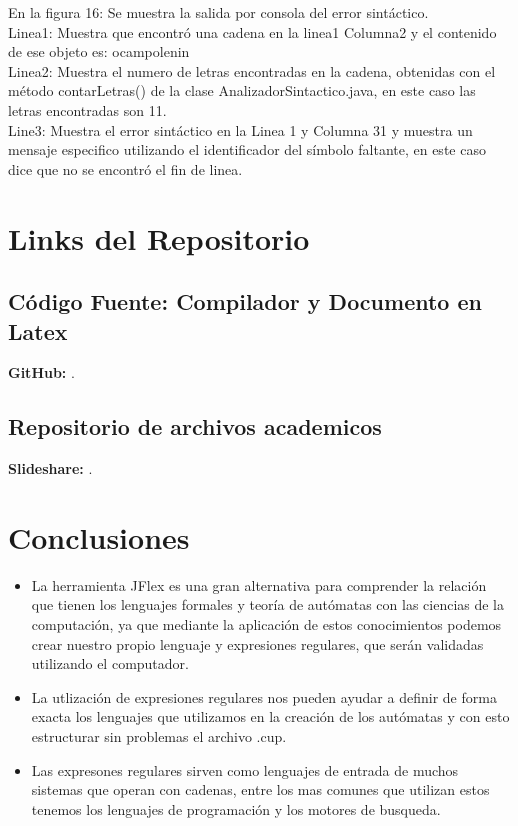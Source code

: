 \documentclass[a4paper,openright,12pt]{article}
\begin{document}
En la figura 16: Se muestra la salida por consola del error sintáctico.\\

Linea1: Muestra que encontró una cadena en la linea1 Columna2 y el contenido de ese objeto es: ocampolenin\\

Linea2:  Muestra el numero de letras encontradas en la cadena, obtenidas con el método contarLetras() de la clase AnalizadorSintactico.java, en este caso las letras encontradas son 11.\\

Line3: Muestra el error sintáctico en la Linea 1 y Columna 31 y muestra un mensaje especifico utilizando el identificador del símbolo faltante, en este caso dice que no se encontró el fin de linea.


\newpage
\section{Links del Repositorio}

\subsection{Código Fuente: Compilador y Documento en Latex}

\textbf{GitHub: } \url{}.

\subsection{Repositorio de archivos academicos }

\textbf{Slideshare: } \url{}.

\newpage
\section{Conclusiones}

\begin{itemize}

\item La herramienta JFlex es una gran alternativa para comprender la relación que tienen los lenguajes formales y teoría de autómatas con las ciencias de la computación, ya que mediante la aplicación de estos conocimientos podemos crear nuestro propio lenguaje y expresiones regulares, que serán validadas utilizando el computador.
\item La utlización de expresiones regulares nos pueden ayudar a definir de forma exacta los lenguajes que utilizamos en la creación de los autómatas y con esto estructurar sin problemas el archivo .cup.

\item Las expresones regulares sirven como lenguajes de entrada de muchos sistemas que operan con cadenas, entre los mas comunes que utilizan estos tenemos los lenguajes de programación y los motores de busqueda.
\end{itemize}
\end{document}
